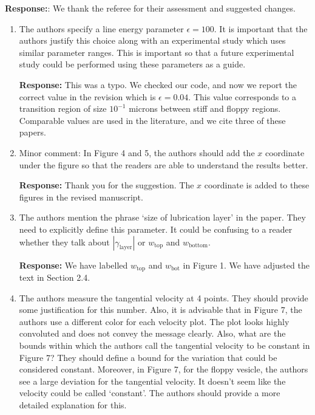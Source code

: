 \documentclass[11pt]{article}
\begin{document}
\noindent
{\bf Response:}: We thank the referee for their assessment and suggested
changes.

\begin{enumerate}
\item The authors specify a line energy parameter $\epsilon = 100$. It
  is important that the authors justify this choice along with an
    experimental study which uses similar parameter ranges. This is
    important so that a future experimental study could be performed
    using these parameters as a guide.

\noindent
{\bf Response:} This was a typo. We checked our code, and now we
report the correct value in the revision which is $\epsilon = 0.04$.
This value corresponds to a transition region of size $10^{-1}$ microns
between stiff and floppy regions. Comparable values are used in the
literature, and we cite three of these papers.

\item Minor comment: In Figure 4 and 5, the authors should add the $x$
  coordinate under the figure so that the readers are able to understand
    the results better.

\noindent
{\bf Response:} Thank you for the suggestion. The $x$ coordinate is
added to these figures in the revised manuscript.

\item The authors mention the phrase `size of lubrication layer' in the
  paper. They need to explicitly define this parameter. It could be
    confusing to a reader whether they talk about
    $|\gamma_{\mathrm{layer}}|$ or $w_{\mathrm{top}}$ and
    $w_{\mathrm{bottom}}$.

\noindent
{\bf Response:} We have labelled $w_{\mathrm{top}}$ and
$w_{\mathrm{bot}}$ in Figure 1. We have adjusted the text in Section
2.4.

\item The authors measure the tangential velocity at 4 points. They
  should provide some justification for this number. Also, it is
    advisable that in Figure 7, the authors use a different color for
    each velocity plot. The plot looks highly convoluted and does not
    convey the message clearly. Also, what are the bounds within which
    the authors call the tangential velocity to be constant in Figure 7?
    They should define a bound for the variation that could be
    considered constant. Moreover, in Figure 7, for the floppy vesicle,
    the authors see a large deviation for the tangential velocity. It
    doesn't seem like the velocity could be called `constant'. The
    authors should provide a more detailed explanation for this.


\end{enumerate}
\end{document}
